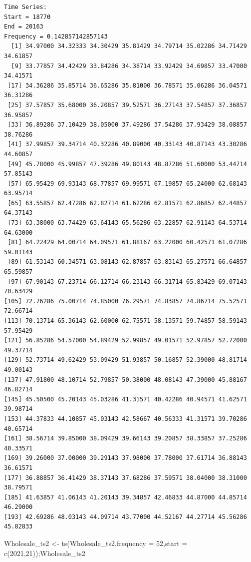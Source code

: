 \documentclass[
  letterpaper,
  DIV=11,
  numbers=noendperiod]{scrartcl}
\newenvironment{Shaded}{\begin{snugshade}}{\end{snugshade}}
\newcommand{\AttributeTok}[1]{\textcolor[rgb]{0.40,0.45,0.13}{#1}}
\newcommand{\DecValTok}[1]{\textcolor[rgb]{0.68,0.00,0.00}{#1}}
\newcommand{\FunctionTok}[1]{\textcolor[rgb]{0.28,0.35,0.67}{#1}}
\newcommand{\NormalTok}[1]{\textcolor[rgb]{0.00,0.23,0.31}{#1}}
\newcommand{\OtherTok}[1]{\textcolor[rgb]{0.00,0.23,0.31}{#1}}
\begin{document}
\begin{verbatim}
Time Series:
Start = 18770 
End = 20163 
Frequency = 0.142857142857143 
  [1] 34.97000 34.32333 34.30429 35.81429 34.79714 35.02286 34.71429 34.61857
  [9] 33.77857 34.42429 33.84286 34.38714 33.92429 34.69857 33.47000 34.41571
 [17] 34.36286 35.85714 36.65286 35.81000 36.78571 35.06286 36.04571 36.31286
 [25] 37.57857 35.68000 36.20857 39.52571 36.27143 37.54857 37.36857 36.95857
 [33] 36.89286 37.10429 38.05000 37.49286 37.54286 37.93429 38.08857 38.76286
 [41] 37.99857 39.34714 40.32286 40.89000 40.33143 40.87143 43.30286 44.60857
 [49] 45.78000 45.99857 47.39286 49.80143 48.87286 51.60000 53.44714 57.85143
 [57] 65.95429 69.93143 68.77857 69.99571 67.19857 65.24000 62.68143 63.95714
 [65] 63.55857 62.47286 62.82714 61.62286 62.81571 62.86857 62.44857 64.37143
 [73] 63.38000 63.74429 63.64143 65.56286 63.22857 62.91143 64.53714 64.63000
 [81] 64.22429 64.00714 64.09571 61.88167 63.22000 60.42571 61.07286 59.01143
 [89] 61.53143 60.34571 63.08143 62.87857 63.83143 65.27571 66.64857 65.59857
 [97] 67.90143 67.23714 66.12714 66.23143 66.31714 65.83429 69.07143 70.63429
[105] 72.76286 75.00714 74.85000 76.29571 74.83857 74.86714 75.52571 72.66714
[113] 70.13714 65.36143 62.60000 62.75571 58.13571 59.74857 58.59143 57.95429
[121] 56.85286 54.57000 54.89429 52.99857 49.01571 52.97857 52.72000 49.37714
[129] 52.73714 49.62429 53.09429 51.93857 50.16857 52.39000 48.81714 49.00143
[137] 47.91800 48.10714 52.79857 50.38000 48.08143 47.39000 45.88167 46.82714
[145] 45.50500 45.20143 45.03286 41.31571 40.42286 40.94571 41.62571 39.98714
[153] 44.37833 44.10857 45.03143 42.58667 40.56333 41.31571 39.70286 40.65714
[161] 38.56714 39.85000 38.09429 39.66143 39.20857 38.33857 37.25286 40.33571
[169] 39.26000 37.00000 39.29143 37.98000 37.78000 37.61714 36.88143 36.61571
[177] 36.88857 36.41429 38.37143 37.68286 37.59571 38.04000 38.31000 38.79571
[185] 41.63857 41.06143 41.20143 39.34857 42.46833 44.87000 44.85714 46.29000
[193] 42.69286 48.03143 44.09714 43.77000 44.52167 44.27714 45.56286 45.82833
\end{verbatim}

\begin{Shaded}
\begin{Highlighting}[]
\NormalTok{Wholesale\_ts2 }\OtherTok{\textless{}{-}} \FunctionTok{ts}\NormalTok{(Wholesale\_ts2,}\AttributeTok{frequency =} \DecValTok{52}\NormalTok{,}\AttributeTok{start =} \FunctionTok{c}\NormalTok{(}\DecValTok{2021}\NormalTok{,}\DecValTok{21}\NormalTok{));Wholesale\_ts2}
\end{Highlighting}
\end{Shaded}
\end{document}
